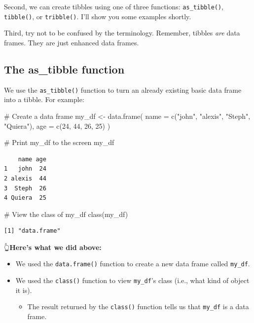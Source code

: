\documentclass[
  letterpaper,
  DIV=11,
  numbers=noendperiod]{scrreprt}
\newenvironment{Shaded}{\begin{snugshade}}{\end{snugshade}}
\newcommand{\AttributeTok}[1]{\textcolor[rgb]{0.40,0.45,0.13}{#1}}
\newcommand{\CommentTok}[1]{\textcolor[rgb]{0.37,0.37,0.37}{#1}}
\newcommand{\DecValTok}[1]{\textcolor[rgb]{0.68,0.00,0.00}{#1}}
\newcommand{\FunctionTok}[1]{\textcolor[rgb]{0.28,0.35,0.67}{#1}}
\newcommand{\NormalTok}[1]{\textcolor[rgb]{0.00,0.23,0.31}{#1}}
\newcommand{\OtherTok}[1]{\textcolor[rgb]{0.00,0.23,0.31}{#1}}
\newcommand{\StringTok}[1]{\textcolor[rgb]{0.13,0.47,0.30}{#1}}
\providecommand{\tightlist}{%
  \setlength{\itemsep}{0pt}\setlength{\parskip}{0pt}}\usepackage{longtable,booktabs,array}
\begin{document}
Second, we can create tibbles using one of three functions:
\texttt{as\_tibble()}, \texttt{tibble()}, or \texttt{tribble()}. I'll
show you some examples shortly.

Third, try not to be confused by the terminology. Remember, tibbles
\emph{are} data frames. They are just enhanced data frames.

\subsection{The as\_tibble function}\label{the-as_tibble-function}

We use the \texttt{as\_tibble()} function to turn an already existing
basic data frame into a tibble. For example:

\begin{Shaded}
\begin{Highlighting}[]
\CommentTok{\# Create a data frame}
\NormalTok{my\_df }\OtherTok{\textless{}{-}} \FunctionTok{data.frame}\NormalTok{(}
  \AttributeTok{name =} \FunctionTok{c}\NormalTok{(}\StringTok{"john"}\NormalTok{, }\StringTok{"alexis"}\NormalTok{, }\StringTok{"Steph"}\NormalTok{, }\StringTok{"Quiera"}\NormalTok{),}
  \AttributeTok{age  =} \FunctionTok{c}\NormalTok{(}\DecValTok{24}\NormalTok{, }\DecValTok{44}\NormalTok{, }\DecValTok{26}\NormalTok{, }\DecValTok{25}\NormalTok{)}
\NormalTok{)}

\CommentTok{\# Print my\_df to the screen}
\NormalTok{my\_df}
\end{Highlighting}
\end{Shaded}

\begin{verbatim}
    name age
1   john  24
2 alexis  44
3  Steph  26
4 Quiera  25
\end{verbatim}

\begin{Shaded}
\begin{Highlighting}[]
\CommentTok{\# View the class of my\_df}
\FunctionTok{class}\NormalTok{(my\_df)}
\end{Highlighting}
\end{Shaded}

\begin{verbatim}
[1] "data.frame"
\end{verbatim}

👆\textbf{Here's what we did above:}

\begin{itemize}
\item
  We used the \texttt{data.frame()} function to create a new data frame
  called \texttt{my\_df}.
\item
  We used the \texttt{class()} function to view \texttt{my\_df}'s class
  (i.e., what kind of object it is).

  \begin{itemize}
  \tightlist
  \item
    The result returned by the \texttt{class()} function tells us that
    \texttt{my\_df} is a data frame.
  \end{itemize}
\end{itemize}
\end{document}
